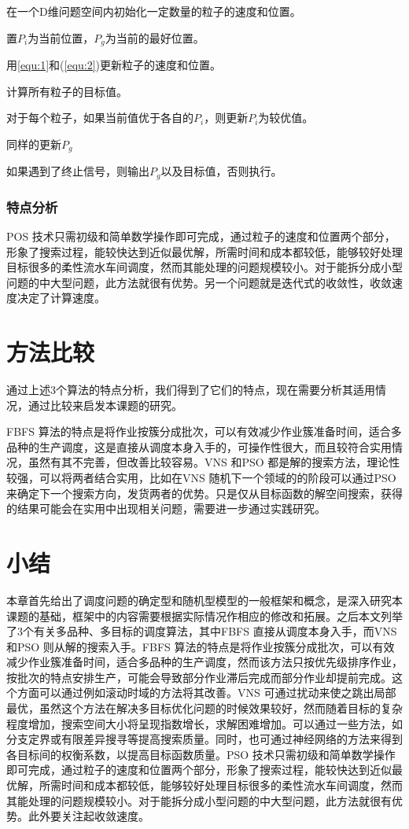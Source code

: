 \begin{asparaenum}
\renewcommand{\labelenumi}{\heiti 步骤\theenumi~}
\item 在一个D维问题空间内初始化一定数量的粒子的速度和位置。
\item 置$P_i$为当前位置，$P_g$为当前的最好位置。
\item 用\eqref{equ:1}和(\ref{equ:2})更新粒子的速度和位置。
\item 计算所有粒子的目标值。
\item 对于每个粒子，如果当前值优于各自的$P_i$，则更新$P_i$为较优值。
\item 同样的更新$P_g$
\item 如果遇到了终止信号，则输出$P_g$以及目标值，否则执行。
\end{asparaenum}

\subsubsection{特点分析}
POS 技术只需初级和简单数学操作即可完成，通过粒子的速度和位置两个部分，形象了搜索过程，能较快达到近似最优解，所需时间和成本都较低，能够较好处理目标很多的柔性流水车间调度，然而其能处理的问题规模较小。对于能拆分成小型问题的中大型问题，此方法就很有优势。另一个问题就是迭代式的收敛性，收敛速度决定了计算速度。
\section{方法比较}
通过上述3个算法的特点分析，我们得到了它们的特点，现在需要分析其适用情况，通过比较来启发本课题的研究。

FBFS 算法的特点是将作业按簇分成批次，可以有效减少作业簇准备时间，适合多品种的生产调度，这是直接从调度本身入手的，可操作性很大，而且较符合实用情况，虽然有其不完善，但改善比较容易。VNS 和PSO 都是解的搜索方法，理论性较强，可以将两者结合实用，比如在VNS 随机下一个领域的的阶段可以通过PSO 来确定下一个搜索方向，发货两者的优势。只是仅从目标函数的解空间搜索，获得的结果可能会在实用中出现相关问题，需要进一步通过实践研究。

\section{小结}
本章首先给出了调度问题的确定型和随机型模型的一般框架和概念，是深入研究本课题的基础，框架中的内容需要根据实际情况作相应的修改和拓展。之后本文列举了3个有关多品种、多目标的调度算法，其中FBFS 直接从调度本身入手，而VNS 和PSO 则从解的搜索入手。FBFS 算法的特点是将作业按簇分成批次，可以有效减少作业簇准备时间，适合多品种的生产调度，然而该方法只按优先级排序作业，按批次的特点安排生产，可能会导致部分作业滞后完成而部分作业却提前完成。这个方面可以通过例如滚动时域的方法将其改善。VNS 可通过扰动来使之跳出局部最优，虽然这个方法在解决多目标优化问题的时候效果较好，然而随着目标的复杂程度增加，搜索空间大小将呈现指数增长，求解困难增加。可以通过一些方法，如分支定界或有限差异搜寻等提高搜索质量。同时，也可通过神经网络的方法来得到各目标间的权衡系数，以提高目标函数质量。PSO 技术只需初级和简单数学操作即可完成，通过粒子的速度和位置两个部分，形象了搜索过程，能较快达到近似最优解，所需时间和成本都较低，能够较好处理目标很多的柔性流水车间调度，然而其能处理的问题规模较小。对于能拆分成小型问题的中大型问题，此方法就很有优势。此外要关注起收敛速度。